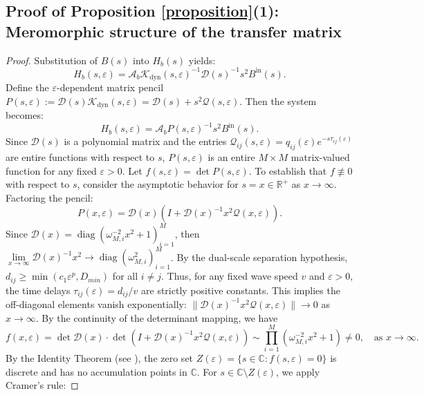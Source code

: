 \documentclass[11pt,a4paper]{article}
\numberwithin{equation}{section}
\begin{document}
\subsection{Proof of Proposition \ref{proposition}(1): Meromorphic structure of the transfer matrix}
\begin{proof}

Substitution of $B(s)$ into $H_b(s)$ yields:
\[
    H_b(s, \varepsilon) = \mathcal{A}_b \mathcal{K}_{\mathrm{dyn}}(s, \varepsilon)^{-1} \mathcal{D}(s)^{-1} s^2 B^{\mathrm{in}}(s).
\]
Define the $\varepsilon$-dependent matrix pencil $P(s, \varepsilon) := \mathcal{D}(s)\mathcal{K}_{\mathrm{dyn}}(s, \varepsilon) = \mathcal{D}(s) + s^2 \mathcal{Q}(s, \varepsilon)$. Then the system becomes:
\begin{equation} \label{eq:Hb_pencil_compact}
    H_b(s, \varepsilon) = \mathcal{A}_b P(s, \varepsilon)^{-1} s^2 B^{\mathrm{in}}(s).
\end{equation}
Since $\mathcal{D}(s)$ is a polynomial matrix and the entries $\mathcal{Q}_{ij}(s, \varepsilon) = q_{ij}(\varepsilon) e^{-s\tau_{ij}(\varepsilon)}$ are entire functions with respect to $s$, $P(s, \varepsilon)$ is an entire $M \times M$ matrix-valued function for any fixed $\varepsilon > 0$.
\newline
Let $f(s, \varepsilon) = \det P(s, \varepsilon)$. To establish that $f \not\equiv 0$ with respect to $s$, consider the asymptotic behavior for $s = x \in \mathbb{R}^{+}$ as $x \to \infty$. Factoring the pencil:
\[
    P(x, \varepsilon) = \mathcal{D}(x) \left( I + \mathcal{D}(x)^{-1} x^2 \mathcal{Q}(x, \varepsilon) \right).
\]
Since $\mathcal{D}(x) = \operatorname{diag}(\omega_{M,i}^{-2} x^2 + 1)_{i=1}^M$, then $\lim\limits_{x\to \infty}\mathcal{D}(x)^{-1} x^2 \to \operatorname{diag}(\omega_{M,i}^2)_{i=1}^M$. By the dual-scale separation hypothesis, $d_{ij}\ge \min(c_1\varepsilon^p,D_{\textit{min}})$ for all $i\ne j.$ Thus, for any fixed wave speed $v$ and $\varepsilon > 0$, the time delays $\tau_{ij}(\varepsilon) = d_{ij}/v$ are strictly positive constants. 
\newline
This implies the off-diagonal elements vanish exponentially: $\|\mathcal{D}(x)^{-1} x^2 \mathcal{Q}(x, \varepsilon)\| \to 0$ as $x \to \infty.$ By the continuity of the determinant mapping, we have
\[
    f(x, \varepsilon) = \det \mathcal{D}(x) \cdot \det\left(I + \mathcal{D}(x)^{-1} x^2 \mathcal{Q}(x, \varepsilon)\right) \sim \prod_{i=1}^M (\omega_{M,i}^{-2} x^2 + 1) \ne 0, \quad \text{as } x \to \infty.
\]
By the Identity Theorem (see \cite[Ch. 4]{complex1}), the zero set $Z(\varepsilon) = \{s \in \mathbb{C} : f(s, \varepsilon) = 0\}$ is discrete and has no accumulation points in $\mathbb{C}$. For $s \in \mathbb{C} \setminus Z(\varepsilon)$, we apply Cramer's rule:

\end{proof}
\end{document}
